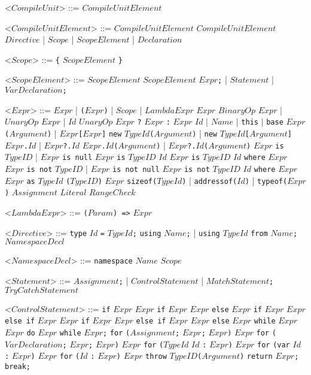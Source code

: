 \documentclass{article}
\newcommand{\gtext}[1]{<$#1$>}
\newcommand{\glit}[1]{\texttt{#1}}
\begin{document}
\begin{grammar}

	\gtext{CompileUnit} ::= $CompileUnitElement$

	\gtext{CompileUnitElement} ::= $CompileUnitElement$ $CompileUnitElement$
	\alt $Directive$ | $Scope$ | $ScopeElement$ | $Declaration$

	\gtext{Scope} ::= \glit{\{} $ScopeElement$ \glit{\}}
	
	\gtext{ScopeElement} ::= $ScopeElement$ $ScopeElement$
	\alt $Expr$\glit{;} | $Statement$	| $VarDeclaration$\glit{;}
	
	\gtext{Expr} ::= $Expr$ | \glit{(}$Expr$\glit{)} | $Scope$ | $LambdaExpr$
	\alt $Expr$ $BinaryOp$ $Expr$ | $UnaryOp$ $Expr$ | $Id$ $UnaryOp$
	\alt $Expr$ \glit{?} $Expr$ \glit{:} $Expr$
	\alt $Id$ | $Name$ | \glit{this} | \glit{base}
	\alt $Expr$\glit{(}$Argument$\glit{)} | $Expr$\glit{[}$Expr$\glit{]}
	\alt \glit{new} $TypeId$\glit{(}$Argument$\glit{)} | \glit{new} $TypeId$\glit{[}$Argument$\glit{]}
	\alt $Expr$\glit{.}$Id$ | $Expr$\glit{?.}$Id$ 
	\alt $Expr$\glit{.}$Id$\glit{(}$Argument$\glit{)} | $Expr$\glit{?.}$Id$\glit{(}$Argument$\glit{)}
	\alt $Expr$ \glit{is} $TypeID$ | $Expr$ \glit{is null} $Expr$ \glit{is} $TypeID$ $Id$
	\alt $Expr$ \glit{is} $TypeID$ $Id$ \glit{where} $Expr$
	\alt $Expr$ \glit{is not} $TypeID$ | $Expr$ \glit{is not null}
	\alt $Expr$ \glit{is not} $TypeID$ $Id$ \glit{where} $Expr$ %
	\alt $Expr$ \glit{as} $TypeId$
	\alt \glit{(}$TypeID$\glit{)} $Expr$
	\alt \glit{sizeof($TypeId$}\glit{)} | \glit{addressof($Id$}\glit{)} | \glit{typeof($Expr$}\glit{)}
	\alt $Assignment$
	\alt $Literal$
	\alt $RangeCheck$
	
	\gtext{LambdaExpr} ::= \glit{(}$Param$\glit{) =>} $Expr$
	
	\gtext{Directive} ::= \glit{type} $Id$ \glit{=} $TypeId$\glit{;}
	\alt \glit{using} $Name$\glit{;} | \glit{using} $TypeId$ \glit{from} $Name$\glit{;}
	\alt $NamespaceDecl$

	\gtext{NamespaceDecl} ::= \glit{namespace} $Name$ $Scope$
	
	\gtext{Statement} ::= $Assignment$\glit{;} | $ControlStatement$ | $MatchStatement$\glit{;}
	\alt $TryCatchStatement$
	
	\newpage	
	
	\gtext{ControlStatement} ::= \glit{if} $Expr$ $Expr$
	\alt \glit{if} $Expr$ $Expr$ \glit{else} $Expr$
	\alt \glit{if} $Expr$ $Expr$ \glit{else if} $Expr$ $Expr$
	\alt \glit{if} $Expr$ $Expr$ \glit{else if} $Expr$ $Expr$ \glit{else} $Expr$
	\alt \glit{while} $Expr$ $Expr$
	\alt \glit{do} $Expr$ \glit{while} $Expr$\glit{;}
	\alt \glit{for} \glit{(}$Assignment$\glit{;} $Expr$\glit{;} $Expr$\glit{)} $Expr$
	\alt \glit{for} \glit{(}$VarDeclaration$\glit{;} $Expr$\glit{;} $Expr$\glit{)} $Expr$
	\alt \glit{for} \glit{(}$TypeId$ $Id$ \glit{:} $Expr$\glit{)} $Expr$
	\alt \glit{for} \glit{(var} $Id$ \glit{:} $Expr$\glit{)} $Expr$
	\alt \glit{for} \glit{(}$Id$ \glit{:} $Expr$\glit{)} $Expr$ %
	\alt \glit{throw} $TypeID$\glit{(}$Argument$\glit{)}
	\alt \glit{return} $Expr$\glit{;}
	\alt \glit{break;}
	

\end{grammar}
\end{document}
